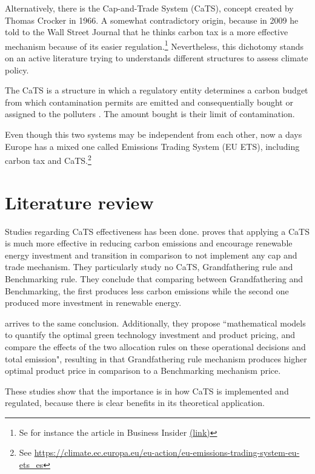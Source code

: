 \documentclass[a4paper,fleqn]{cas-dc}
\begin{document}
Alternatively, there is the Cap-and-Trade System (CaTS), concept created by Thomas Crocker in 1966. A somewhat contradictory origin, because in 2009 he  told to the Wall Street Journal that he thinks carbon tax is a more effective mechanism because of its easier regulation.\footnote{Se for instance the article in Business Insider \href{https://www.businessinsider.com/inventor-of-cap-and-trade-says-a-carbon-tax-is-better-2009-8}{(link)}} Nevertheless, this dichotomy stands on an active literature trying to understands different structures to assess climate policy.


The CaTS is a structure in which a regulatory entity determines a carbon budget from which contamination permits are emitted and consequentially bought or assigned to the polluters \citep{hanemann_cap-and-trade_2010}. The amount bought is their limit of contamination.  

Even though this two systems may be independent from each other, now a days Europe has a mixed one called Emissions Trading System (EU ETS), including carbon tax and CaTS.\footnote{See \url{https://climate.ec.europa.eu/eu-action/eu-emissions-trading-system-eu-ets_es}} 


\section{Literature review}\label{sec:review}

Studies regarding CaTS effectiveness has been done. \cite{chen_renewable_2021} proves that applying a CaTS is much more effective in reducing carbon emissions and encourage renewable energy investment and transition in 
comparison to not implement any cap and trade mechanism. They particularly study no CaTS, Grandfathering 
rule and Benchmarking rule. They conclude that comparing between Grandfathering and Benchmarking, the first produces less carbon emissions while the second one produced more investment in renewable energy.

\cite{yang_effects_2020} arrives to the same conclusion. Additionally, they propose ``mathematical models to quantify the optimal green technology investment and product pricing, and compare the
effects of the two allocation rules on these operational decisions and total emission", resulting in that Grandfathering rule mechanism produces higher optimal product price in comparison to a Benchmarking mechanism price. 

These studies show that the importance is in how CaTS is implemented and regulated, because there is clear benefits in its theoretical application. 
\end{document}
